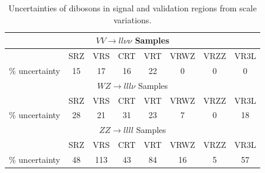 \begin{table}
   \begin{center}
      \begin{tabular}{l|c|c|c|c|c|c|c}
          \hline \hline 
            \multicolumn{8}{c}{$VV \rightarrow ll\nu\nu$ Samples} \\
         \hline
         &  SRZ & VRS & CRT & VRT & VRWZ & VRZZ & VR3L \\
         \hline
         \% uncertainty & 15 & 17 & 16 & 22 & 0 & 0 & 0 \\
          \hline 
            \multicolumn{8}{c}{$WZ \rightarrow lll\nu$ Samples} \\
         \hline
         &  SRZ & VRS & CRT & VRT & VRWZ & VRZZ & VR3L \\
         \hline
         \% uncertainty & 28 & 21 & 31 & 23 & 7 & 0 & 18 \\
         \hline
            \multicolumn{8}{c}{$ZZ \rightarrow llll$ Samples} \\
         \hline
         &  SRZ & VRS & CRT & VRT & VRWZ & VRZZ & VR3L \\
         \hline
         \% uncertainty & 48 & 113 & 43 & 84 & 16 & 5 & 57 \\
         \hline\hline
      \end{tabular}
   \end{center}
   \caption{Uncertainties of dibosons in signal and validation regions from \sherpa scale variations.}
   \label{table:Diboson_theoryuncert}
\end{table}

